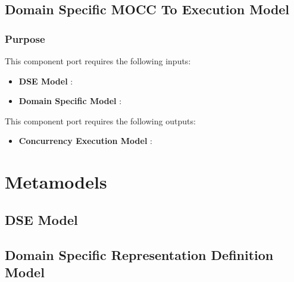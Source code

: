 \documentclass{gemoc} %
\begin{document}


\subsection{Domain Specific MOCC To Execution Model}


\subsubsection{Purpose}

This component port requires the following inputs:
\begin{itemize}
  \item \textbf{DSE Model} :
  \item \textbf{Domain Specific Model} :
\end{itemize}

This component port requires the following outputs:
\begin{itemize}
  \item \textbf{Concurrency Execution Model} :
\end{itemize}

\section{Metamodels}
\subsection{DSE Model}


\subsection{Domain Specific  Representation Definition Model}
\end{document}
